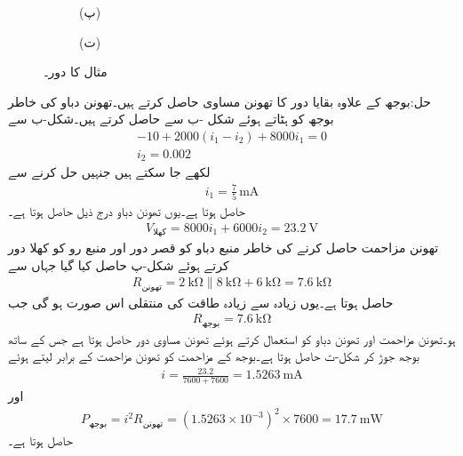 \begin{figure}
\begin{subfigure}{0.5\textwidth}
\caption*{(پ)}
\end{subfigure}
\begin{subfigure}{0.5\textwidth}
\centering
{}
\caption*{(ت)}%
\end{subfigure}
\caption{مثال  کا دور۔}
\label{شکل_مسئلہ_طاقت_منتقلی_الف}
\end{figure}

حل:بوجھ کے علاوہ بقایا دور کا تھونن مساوی حاصل کرتے ہیں۔تھونن دباو کی خاطر بوجھ کو ہٹاتے ہوئے شکل -ب سے  حاصل کرتے ہیں۔شکل-ب سے
\begin{align*}
-10+2000(i_1-i_2)+8000i_1=0\\
i_2=0.002
\end{align*}
لکھے جا سکتے ہیں جنہیں حل کرنے سے
\begin{align*}
i_1=\frac{7}{5}\,\si{\milli\ampere}
\end{align*}
حاصل ہوتا ہے۔یوں تھونن دباو درج ذیل حاصل ہوتا ہے۔
\begin{align*}
V_{\text{کھلا}}=8000i_1+6000i_2 =\SI{23.2}{\volt}
\end{align*}
تھونن مزاحمت حاصل کرنے کی خاطر منبع دباو کو قصر دور اور منبع رو کو کھلا دور کرتے ہوئے شکل-پ حاصل کیا گیا جہاں سے
\begin{align*}
R_{\text{تھونن}}=\SI{2}{\kilo\ohm} \parallel \SI{8}{\kilo\ohm}+\SI{6}{\kilo\ohm}=\SI{7.6}{\kilo\ohm}
\end{align*}
حاصل ہوتا ہے۔یوں زیادہ سے زیادہ طاقت کی منتقلی اس صورت ہو گی جب 
\begin{align*}
R_{\text{بوجھ}}=\SI{7.6}{\kilo\ohm}
\end{align*}
ہو۔تھونن مزاحمت اور تھونن دباو  کو استعمال کرتے ہوئے تھونن مساوی دور حاصل ہوتا ہے جس کے ساتھ بوجھ جوڑ کر شکل-ت حاصل ہوتا ہے۔بوجھ کے مزاحمت کو تھونن مزاحمت کے برابر لیتے ہوئے
\begin{align*}
i=\frac{23.2}{7600+7600}=\SI{1.5263}{\milli\ampere}
\end{align*}
اور
\begin{align*}
P_{\text{بوجھ}}=i^2 R_{\text{تھونن}} = \left(1.5263\times 10^{-3}\right)^2 \times 7600=\SI{17.7}{\milli\watt}
\end{align*}
حاصل ہوتا ہے۔

